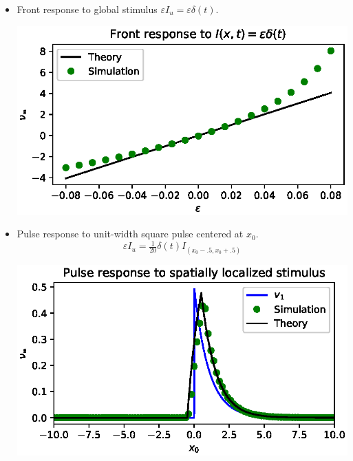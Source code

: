 \documentclass[landscape,final]{baposter}
\begin{document}
\begin{poster}
{
	\begin{itemize}
		\item Front response to global stimulus $\varepsilon I_u = \varepsilon \delta(t)$.
		\vspace{-.5cm}
		\begin{center}
			\includegraphics[width=.9\linewidth, trim={0cm, .2cm, 0cm, .2cm}, clip=true]{fig_spatially_homogeneous_limit}
		\end{center}
		\vspace{-.7cm}
		\item Pulse response to unit-width square pulse centered at $x_0$. 
		\[
			\varepsilon I_u = \tfrac{1}{20} \delta(t) I_{(x_0 - .5, x_0 + .5)}
		\]
		\begin{center}
			\includegraphics[width=.9\linewidth, trim={0cm, 0cm, 0cm, .2cm}, clip=true]{spatially_localized}
		\end{center}
	\end{itemize}
}


\end{poster}
\end{document}

